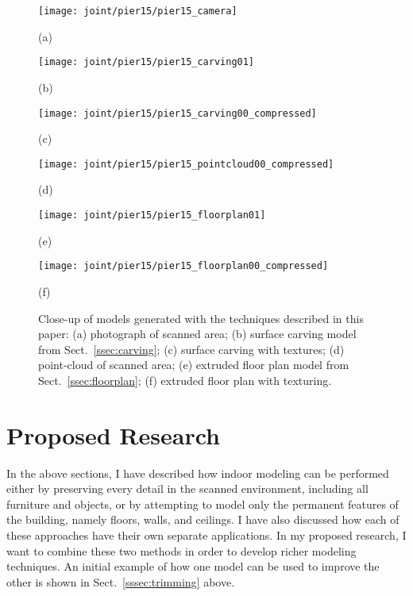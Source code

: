 \documentclass[journal]{IEEEtran}
\begin{document}
\begin{figure*}[t]

	\begin{minipage}[t]{0.30\linewidth}
		\centerline{\texttt{[image: joint/pier15/pier15\_camera]}}
		\centerline{(a)}\medskip
	\end{minipage}
	\hfill
	\begin{minipage}[t]{0.30\linewidth}
		\centerline{\texttt{[image: joint/pier15/pier15\_carving01]}}
		\centerline{(b)}\medskip
	\end{minipage}
	\hfill
	\begin{minipage}[t]{0.30\linewidth}
		\centerline{\texttt{[image: joint/pier15/pier15\_carving00\_compressed]}}
		\centerline{(c)}\medskip
	\end{minipage}
	
	\begin{minipage}[b]{0.30\linewidth}
		\centerline{\texttt{[image: joint/pier15/pier15\_pointcloud00\_compressed]}}
		\centerline{(d)}\medskip
	\end{minipage}
	\hfill
	\begin{minipage}[b]{0.30\linewidth}
		\centerline{\texttt{[image: joint/pier15/pier15\_floorplan01]}}
		\centerline{(e)}\medskip
	\end{minipage}
	\hfill
	\begin{minipage}[b]{0.30\linewidth}
		\centerline{\texttt{[image: joint/pier15/pier15\_floorplan00\_compressed]}}
		\centerline{(f)}\medskip
	\end{minipage}
	
	\caption{Close-up of models generated with the techniques described in this paper:  (a) photograph of scanned area; (b) surface carving model from Sect.~\ref{ssec:carving}; (c) surface carving with textures; (d) point-cloud of scanned area; (e) extruded floor plan model from Sect.~\ref{ssec:floorplan}; (f) extruded floor plan with texturing.}
	\label{fig:pier15}

\end{figure*}

\section{Proposed Research}
\label{sec:proposed}

In the above sections, I have described how indoor modeling can be performed either by preserving every detail in the scanned environment, including all furniture and objects, or by attempting to model only the permanent features of the building, namely floors, walls, and ceilings.  I have also discussed how each of these approaches have their own separate applications.  In my proposed research, I want to combine these two methods in order to develop richer modeling techniques.  An initial example of how one model can be used to improve the other is shown in Sect.~\ref{sssec:trimming} above.
\end{document}
